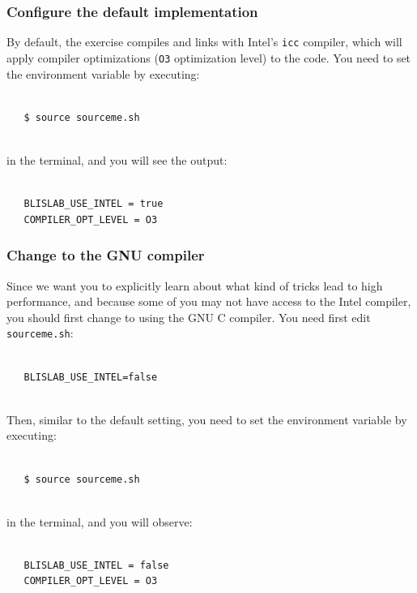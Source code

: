 \subsubsection{Configure the default implementation}
By default, the exercise compiles and links with Intel's {\tt icc} compiler, which will apply compiler optimizations ({\tt O3} optimization level) to the code.
You need to set the environment variable by executing:
\begin{verbatim}

   $ source sourceme.sh
   
\end{verbatim}
in the terminal, and you will see the output:
\begin{verbatim}

   BLISLAB_USE_INTEL = true
   COMPILER_OPT_LEVEL = O3

\end{verbatim}

\subsubsection{Change to the GNU compiler}

Since we want you to explicitly learn about what kind of tricks lead to high performance, and because some of you may not have access to the Intel compiler, you should first change to using the GNU C compiler.
You need first edit {\tt sourceme.sh}: 
\begin{verbatim}

   BLISLAB_USE_INTEL=false
   
\end{verbatim}
Then, similar to the default setting, you need to set the environment variable by executing:
\begin{verbatim}

   $ source sourceme.sh
   
\end{verbatim}
in the terminal, and you will observe:
\begin{verbatim}

   BLISLAB_USE_INTEL = false
   COMPILER_OPT_LEVEL = O3
   
\end{verbatim}

